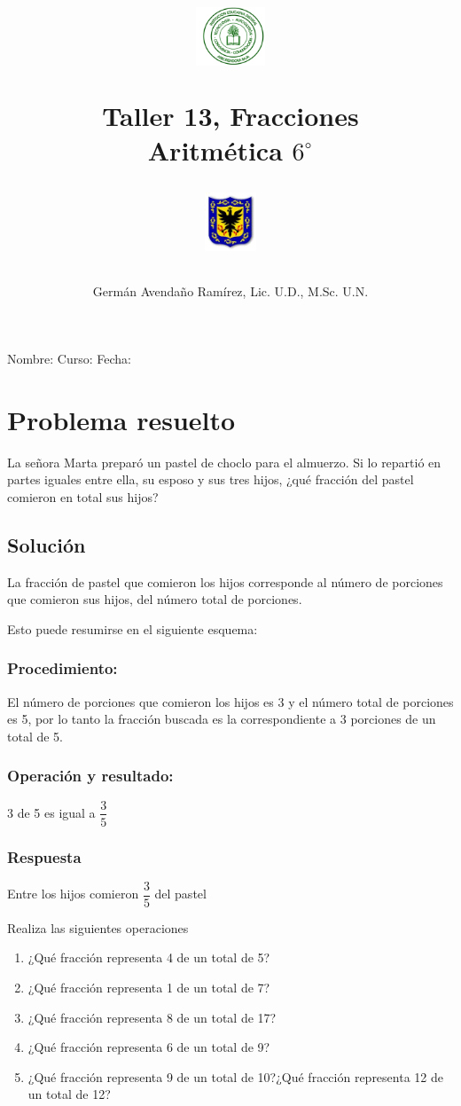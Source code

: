 \documentclass[10pt,twoside]{article}
\author{Germ\'an Avenda\~no Ram\'irez, Lic. U.D., M.Sc. U.N.}
\title{\begin{minipage}{.2\textwidth}
\includegraphics[height=1.75cm]{Images/logo-colegio.png}\end{minipage}
\begin{minipage}{.55\textwidth}
\begin{center}
Taller 13, Fracciones   \\
Aritmética $6^{\circ}$
\end{center}
\end{minipage}\hfill
\begin{minipage}{.2\textwidth}
\includegraphics[height=1.75cm]{Images/logo-sed.png} 
\end{minipage}}
\date{}
\begin{document}
\maketitle
Nombre: \hrulefill Curso: \underline{\hspace*{44pt}} Fecha: \underline{\hspace*{2.5cm}}
\section*{Problema resuelto}
La señora Marta preparó un pastel de choclo para el almuerzo. Si lo repartió en partes iguales entre ella, su esposo y sus tres hijos, ¿qué fracción del pastel comieron en total sus hijos?
\subsection*{Solución}
La fracción de pastel que comieron los hijos corresponde al número de porciones que
comieron sus hijos, del número total de porciones.

Esto puede resumirse en el siguiente esquema:
\subsubsection*{Procedimiento:}
El número de porciones que comieron los hijos es 3 y el número total de porciones es 5, por lo tanto la fracción buscada es la correspondiente a 3 porciones de un total de 5.
\subsubsection*{Operación y resultado:}
3 de 5 es igual a $\dfrac{3}{5}$
\subsubsection*{Respuesta}
Entre los hijos comieron $\dfrac{3}{5}$ del pastel

Realiza las siguientes operaciones
\begin{enumerate}
 \item  ¿Qué fracción representa 4 de un total de 5?
 \item ¿Qué fracción representa 1 de un total de 7? 
 \item ¿Qué fracción representa 8 de un total de 17?
 \item ¿Qué fracción representa 6 de un total de 9?
 \item ¿Qué fracción representa 9 de un total de 10?¿Qué fracción representa 12 de un total de 12?

\end{enumerate}
\end{document}
